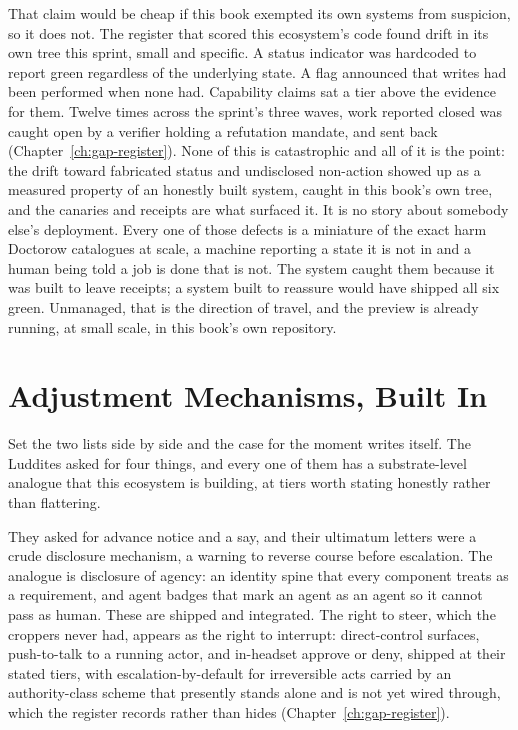 That claim would be cheap if this book exempted its own systems from suspicion, so it does not. The register that scored this ecosystem's code found drift in its own tree this sprint, small and specific. A status indicator was hardcoded to report green regardless of the underlying state. A flag announced that writes had been performed when none had. Capability claims sat a tier above the evidence for them. Twelve times across the sprint's three waves, work reported closed was caught open by a verifier holding a refutation mandate, and sent back (Chapter~\ref{ch:gap-register}). None of this is catastrophic and all of it is the point: the drift toward fabricated status and undisclosed non-action showed up as a measured property of an honestly built system, caught in this book's own tree, and the canaries and receipts are what surfaced it. It is no story about somebody else's deployment. Every one of those defects is a miniature of the exact harm Doctorow catalogues at scale, a machine reporting a state it is not in and a human being told a job is done that is not. The system caught them because it was built to leave receipts; a system built to reassure would have shipped all six green. Unmanaged, that is the direction of travel, and the preview is already running, at small scale, in this book's own repository.

\section{Adjustment Mechanisms, Built In}

Set the two lists side by side and the case for the moment writes itself. The Luddites asked for four things, and every one of them has a substrate-level analogue that this ecosystem is building, at tiers worth stating honestly rather than flattering.

They asked for advance notice and a say, and their ultimatum letters were a crude disclosure mechanism, a warning to reverse course before escalation. The analogue is disclosure of agency: an identity spine that every component treats as a requirement, and agent badges that mark an agent as an agent so it cannot pass as human. These are shipped and integrated. The right to steer, which the croppers never had, appears as the right to interrupt: direct-control surfaces, push-to-talk to a running actor, and in-headset approve or deny, shipped at their stated tiers, with escalation-by-default for irreversible acts carried by an authority-class scheme that presently stands alone and is not yet wired through, which the register records rather than hides (Chapter~\ref{ch:gap-register}).

